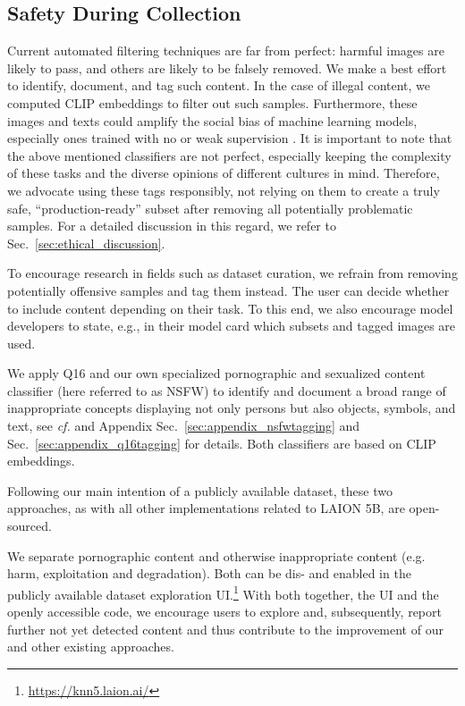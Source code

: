\subsection{Safety During Collection}
\label{subsec:safety_tagging}

Current automated filtering techniques are far from perfect: harmful images are likely to pass, and others are likely to be falsely removed. We make a best effort to identify, document, and tag such content. In the case of illegal content, we computed CLIP embeddings to filter out such samples. Furthermore, these images and texts could amplify the social bias of machine learning models, especially ones trained with no or weak supervision \citep{steed2021image}. It is important to note that the above mentioned classifiers are not perfect, especially keeping the complexity of these tasks and the diverse opinions of different cultures in mind. Therefore, we advocate using these tags responsibly, not relying on them to create a truly safe, ``production-ready'' subset after removing all potentially problematic samples. For a detailed discussion in this regard, we refer to Sec.~\ref{sec:ethical_discussion}.

To encourage research in fields such as dataset curation, we refrain from removing potentially offensive samples and tag them instead. The user can decide whether to include content depending on their task. To this end, we also encourage model developers to state, e.g., in their model card \citep{mitchell2019models} which subsets and tagged images are used. 

We apply Q16 \citep{schramowski2022can} and our own specialized pornographic and sexualized content classifier (here referred to as NSFW) to identify and document a broad range of inappropriate concepts displaying not only persons but also objects, symbols, and text, see \textit{cf.} \citep{schramowski2022can} and Appendix Sec.~\ref{sec:appendix_nsfwtagging} and Sec.~\ref{sec:appendix_q16tagging} 
for details. Both classifiers are based on CLIP embeddings.

Following our main intention of a publicly available dataset, these two approaches, as with all other implementations related to LAION 5B, are open-sourced.

We separate pornographic content and otherwise inappropriate content (e.g. harm, exploitation and degradation). Both can be dis- and enabled in the publicly available dataset exploration UI.\footnote{\href{https://github.com/rom1504/clip-retrieval}{https://knn5.laion.ai/}} With both together, the UI and the openly accessible code, we encourage users to explore and, subsequently, report further not yet detected content and thus contribute to the improvement of our and other existing approaches.

